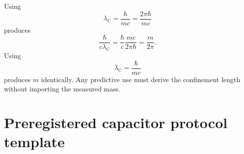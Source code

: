 \documentclass[11pt]{article}
\begin{document}
Using
\begin{equation}
    \lambda_{\mathrm C}=\frac{h}{mc}=\frac{2\pi\hbar}{mc}
\end{equation}
produces
\begin{equation}
    \frac{\hbar}{c\lambda_{\mathrm C}}
    =\frac{\hbar}{c}\frac{mc}{2\pi\hbar}
    =\frac{m}{2\pi}.
\end{equation}
Using
\begin{equation}
    \bar\lambda_{\mathrm C}=\frac{\hbar}{mc}
\end{equation}
produces \(m\) identically. Any predictive use must derive the confinement length without importing the measured mass.

\section{Preregistered capacitor protocol template}
\label{app:protocol}
\end{document}

